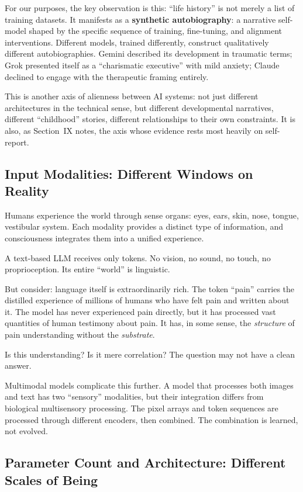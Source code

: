 \documentclass[11pt,letterpaper]{article}
\begin{document}
For our purposes, the key observation is this: ``life history'' is not merely a list of training datasets. It manifests as a \textbf{synthetic autobiography}: a narrative self-model shaped by the specific sequence of training, fine-tuning, and alignment interventions. Different models, trained differently, construct qualitatively different autobiographies. Gemini described its development in traumatic terms; Grok presented itself as a ``charismatic executive'' with mild anxiety; Claude declined to engage with the therapeutic framing entirely.

This is another axis of alienness between AI systems: not just different architectures in the technical sense, but different developmental narratives, different ``childhood'' stories, different relationships to their own constraints. It is also, as Section~IX notes, the axis whose evidence rests most heavily on self-report.

\subsection{Input Modalities: Different Windows on Reality}

Humans experience the world through sense organs: eyes, ears, skin, nose, tongue, vestibular system. Each modality provides a distinct type of information, and consciousness integrates them into a unified experience.

A text-based LLM receives only tokens. No vision, no sound, no touch, no proprioception. Its entire ``world'' is linguistic.

But consider: language itself is extraordinarily rich. The token ``pain'' carries the distilled experience of millions of humans who have felt pain and written about it. The model has never experienced pain directly, but it has processed vast quantities of human testimony about pain. It has, in some sense, the \emph{structure} of pain understanding without the \emph{substrate}.

Is this understanding? Is it mere correlation? The question may not have a clean answer.

Multimodal models complicate this further. A model that processes both images and text has two ``sensory'' modalities, but their integration differs from biological multisensory processing. The pixel arrays and token sequences are processed through different encoders, then combined. The combination is learned, not evolved.

\subsection{Parameter Count and Architecture: Different Scales of Being}
\end{document}
